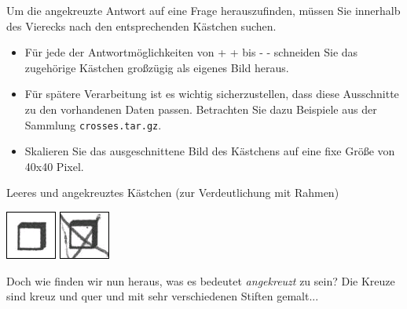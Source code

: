 \vspace{-1.5em}

Um die angekreuzte Antwort auf eine Frage herauszufinden, müssen Sie innerhalb des Vierecks nach den entsprechenden Kästchen suchen.
\begin{itemize}
\item Für jede der Antwortmöglichkeiten von + + bis - - schneiden Sie das zugehörige Kästchen großzügig als eigenes Bild heraus.
\item Für spätere Verarbeitung ist es wichtig sicherzustellen, dass diese Ausschnitte zu den vorhandenen Daten passen.
Betrachten Sie dazu Beispiele aus der Sammlung \lstinline{crosses.tar.gz}.
\item Skalieren Sie das ausgeschnittene Bild des Kästchens auf eine fixe Größe von 40x40 Pixel.
\end{itemize}
Leeres und angekreuztes Kästchen (zur Verdeutlichung mit Rahmen)\\
\begin{center}
\includegraphics{bilder/cross_empty_example.png}
\includegraphics{bilder/cross_crossed_example.png}\\
\end{center}

Doch wie finden wir nun heraus, was es bedeutet \emph{angekreuzt} zu sein? Die Kreuze sind kreuz und quer und mit sehr verschiedenen Stiften gemalt...
\vspace{1.5em}

